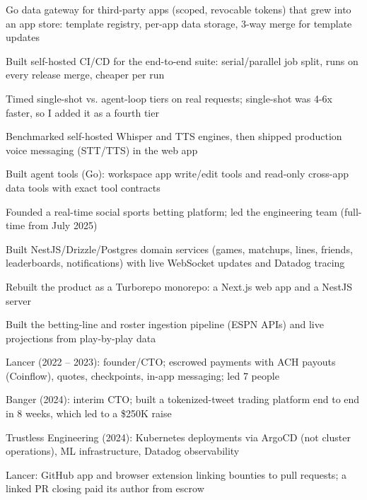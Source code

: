 \documentclass[print]{jack-resume}
\begin{document}
\begin{tightemize}
    \item Go data gateway for third-party apps (scoped, revocable tokens) that grew into an app store: template registry, per-app data storage, 3-way merge for template updates
    \item Built self-hosted CI/CD for the end-to-end suite: serial/parallel job split, runs on every release merge, cheaper per run
    \item Timed single-shot vs. agent-loop tiers on real requests; single-shot was 4-6x faster, so I added it as a fourth tier
    \item Benchmarked self-hosted Whisper and TTS engines, then shipped production voice messaging (STT/TTS) in the web app
    \item Built agent tools (Go): workspace app write/edit tools and read-only cross-app data tools with exact tool contracts
\end{tightemize}
\sectionsep

\begin{tightemize}
    \item Founded a real-time social sports betting platform; led the engineering team (full-time from July 2025)
    \item Built NestJS/Drizzle/Postgres domain services (games, matchups, lines, friends, leaderboards, notifications) with live WebSocket updates and Datadog tracing
    \item Rebuilt the product as a Turborepo monorepo: a Next.js web app and a NestJS server
    \item Built the betting-line and roster ingestion pipeline (ESPN APIs) and live projections from play-by-play data
\end{tightemize}
\sectionsep

\begin{tightemize}
    \item Lancer (2022 -- 2023): founder/CTO; escrowed payments with ACH payouts (Coinflow), quotes, checkpoints, in-app messaging; led 7 people
    \item Banger (2024): interim CTO; built a tokenized-tweet trading platform end to end in 8 weeks, which led to a \$250K raise
    \item Trustless Engineering (2024): Kubernetes deployments via ArgoCD (not cluster operations), ML infrastructure, Datadog observability
    \item Lancer: GitHub app and browser extension linking bounties to pull requests; a linked PR closing paid its author from escrow
\end{tightemize}
\sectionsep
\end{document}
